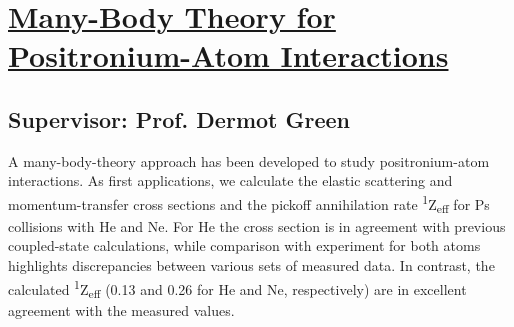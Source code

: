 \section{\href{https://doi.org/10.1103/PhysRevLett.120.183402}{Many-Body Theory 
for Positronium-Atom Interactions}}

\subsection*{Supervisor: Prof. Dermot Green}

A many-body-theory approach has been developed to study positronium-atom 
interactions. As first applications, we calculate the elastic scattering and 
momentum-transfer cross sections and the pickoff annihilation rate
\textsuperscript{1}Z\textsubscript{eff} for Ps collisions with He and Ne. 
For He the cross section is in agreement with previous coupled-state 
calculations, while comparison with experiment for both atoms highlights 
discrepancies between various sets of measured data. In contrast, the 
calculated \textsuperscript{1}Z\textsubscript{eff} (0.13 and 0.26 for He and 
Ne, respectively) are in excellent agreement with the measured values.
